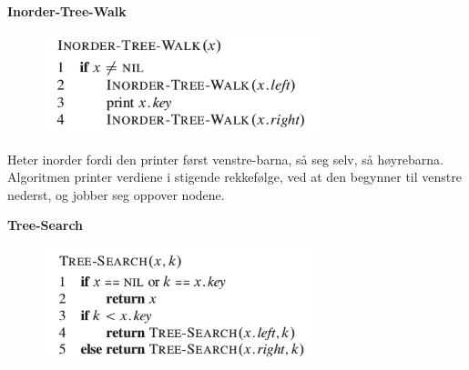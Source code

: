 \documentclass[12pt]{report}
\begin{document}

{\fontsize{14pt}{16.8pt}\selectfont \textbf{Inorder-Tree-Walk}\par}\par


\vspace{\baselineskip}



\begin{figure}[H]
	\begin{Center}
		\includegraphics[width=3.22in,height=1.15in]{./media/image77.png}
	\end{Center}
\end{figure}



\par


\vspace{\baselineskip}
Heter inorder fordi den printer først venstre-barna, så seg selv, så høyrebarna. Algoritmen printer verdiene i stigende rekkefølge, ved at den begynner til venstre nederst, og jobber seg oppover nodene. \par


\vspace{\baselineskip}

\vspace{\baselineskip}
{\fontsize{14pt}{16.8pt}\selectfont \textbf{Tree-Search}\par}\par


\vspace{\baselineskip}



\begin{figure}[H]
	\begin{Center}
		\includegraphics[width=3.15in,height=1.32in]{./media/image78.png}
	\end{Center}
\end{figure}
\end{document}
